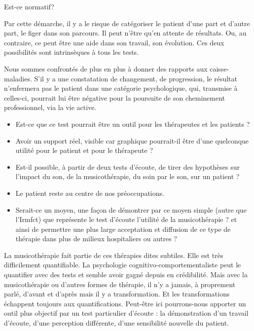 Est-ce normatif? 

  Par cette démarche, il y a le risque de catégoriser le patient d'une part
 et d'autre part, le figer dans son parcours. Il peut n'être qu'en attente de résultats. Ou, au contraire, ce peut être une aide 
dans son travail, son évolution. Ces deux possibilités sont
intrinsèques à tous les tests.

Nous sommes confrontés de plus en plus à donner des rapports aux caisse-maladies.
S'il y a une constatation de changement, de progression, le résultat
n'enfermera pas le patient dans une catégorie psychologique, qui,
transmise à celles-ci, pourrait lui être négative pour la poursuite
de son cheminement professionnel, via la vie active.



\begin{itemize}
\item Est-ce que ce test pourrait être un outil pour les thérapeutes et
les patients ? 
\item Avoir un support réel, visible car graphique pourrait-il être d'une
quelconque utilité pour le patient et pour le thérapeute ?
\item Est-il possible, à partir de deux tests d'écoute, de tirer des hypothèses
sur l'impact du son, de la musicothérapie, du soin par le son, sur
un patient ?
\item Le patient reste au centre de nos préoccupations.
\item Serait-ce un moyen, une façon de démontrer par ce moyen simple (autre
que l'Irmfct) que représente le test d'écoute l'utilité de la musicothérapie
? et ainsi de permettre une plus large acceptation et diffusion de
ce type de thérapie dans plus de milieux hospitaliers ou autres ?


\end{itemize}

La musicothérapie fait partie de ces thérapies dites subtiles. Elle
est très difficilement quantifiable. La
psychologie cognitivo-comportementaliste peut le quantifier avec des tests et semble avoir gagné depuis en crédibilité. Mais avec la musicothérapie ou d'autres formes de thérapie, il n'y a
jamais, à proprement parlé, d'avant et d'après mais il y a transformation.
Et les transformations échappent toujours aux quantifications. Peut-être
ici pourrons-nous apporter un outil plus objectif par un test particulier
d'écoute : la démonstration d'un travail d'écoute, d'une perception
différente, d'une sensibilité nouvelle du patient. 



